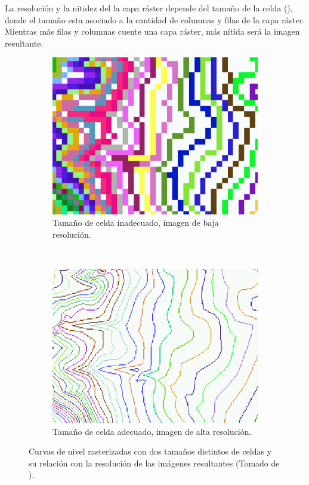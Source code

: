 La resolución y la nitidez del la capa ráster depende del tamaño de la celda
(), donde el tamaño esta asociado a la cantidad de columnas y
filas de la capa ráster. Mientras más filas y columnas cuente una capa ráster, más nítida será la
imagen resultante.


\begin{figure}[!htbp]
    \centering
    \begin{subfigure}[b]{0.4\textwidth}
            \includegraphics[width=\textwidth]{capitulo-2/graphics/raster-baja-resolucion.png}
            \caption{Tamaño de celda inadecuado, imagen de baja resolución.}
    \end{subfigure}
    ~~~~
    \begin{subfigure}[b]{0.4\textwidth}
            \includegraphics[width=\textwidth]{capitulo-2/graphics/raster-alta-resolucion.png}
            \caption{Tamaño de celda adecuado, imagen de alta resolución.}

    \end{subfigure}
    \caption{\label{fig:sig-raster-resolucion}Curvas de nivel rasterizadas con dos tamaños distintos de celdas y su relación con la resolución de las imágenes resultantes (Tomado de \cite{fAlonsoSig2006}).}
\end{figure}

